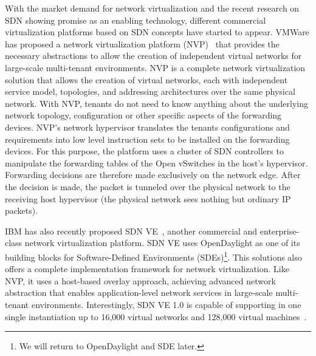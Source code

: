 With the market demand for network virtualization and the recent research on SDN showing promise as an enabling technology, different commercial virtualization platforms based on SDN concepts have started to appear.
VMWare has proposed a network virtualization platform (NVP)~\cite{koponen} that provides the necessary abstractions to allow the creation of independent virtual networks for large-scale multi-tenant environments.
NVP is a complete network virtualization solution that allows the creation of virtual networks, each with independent service model, topologies, and addressing architectures over the same physical network.
With NVP, tenants do not need to know anything about the underlying network topology, configuration or other specific aspects of the forwarding devices. 
NVP's network hypervisor translates the tenants configurations and requirements into low level instruction sets to be installed on the forwarding devices. 
For this purpose, the platform uses a cluster of SDN controllers to manipulate the forwarding tables of the Open vSwitches in the host's hypervisor. 
Forwarding decisions are therefore made exclusively on the network edge.
After the decision is made, the packet is tunneled over the physical network to the receiving host hypervisor (the physical network sees nothing but ordinary IP packets).

IBM has also recently proposed SDN VE~\cite{racherla2014,li2014}, another commercial and enterprise-class network virtualization platform.
SDN VE uses OpenDaylight as one of its building blocks for Software-Defined Environments (SDEs)\footnote{We will return to OpenDaylight and SDE later.}.
This solutions also offers a complete implementation framework for network virtualization. 
Like NVP, it uses a host-based overlay approach, achieving advanced network abstraction that enables application-level network services in large-scale multi-tenant environments. 
Interestingly, SDN VE 1.0 is capable of supporting in one single instantiation up to 16,000 virtual networks and 128,000 virtual machines~\cite{racherla2014,li2014}.

